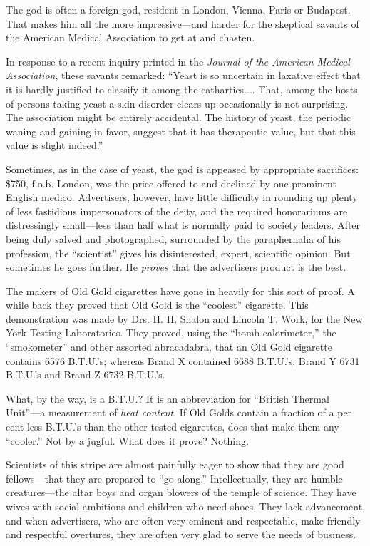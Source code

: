 \documentclass[twoside,nohyper,openany,nobib]{tufte-book}
\begin{document}
The god is often a foreign god, resident in London, Vienna, Paris or
Budapest. That makes him all the more impressive---and harder for the
skeptical savants of the American Medical Association to get at and
chasten.

In response to a recent inquiry printed in the \emph{Journal of the
American Medical Association}, these savants remarked: ``Yeast is so
uncertain in laxative effect that it is hardly justified to classify it
among the cathartics.... That, among the hosts of persons taking yeast a
skin disorder clears up occasionally is not surprising. The association
might be entirely accidental. The history of yeast, the periodic waning
and gaining in favor, suggest that it has therapeutic value, but that
this value is slight indeed.''

Sometimes, as in the case of yeast, the god is appeased by appropriate
sacrifices: \$750, f.o.b. London, was the price offered to and declined
by one prominent English medico. Advertisers, however, have little
difficulty in rounding up plenty of less fastidious impersonators of the
deity, and the required honorariums are distressingly small---less than
half what is normally paid to society leaders. After being duly salved
and photographed, surrounded by the paraphernalia of his profession, the
``scientist'' gives his disinterested, expert, scientific opinion. But
sometimes he goes further. He \emph{proves} that the advertisers product
is the best.

The makers of Old Gold cigarettes have gone in heavily for this sort of
proof. A while back they proved that Old Gold is the ``coolest''
cigarette. This demonstration was made by Drs. H. H. Shalon and Lincoln
T. Work, for the New York Testing Laboratories. They proved, using the
``bomb calorimeter,'' the ``smokometer'' and other assorted abracadabra,
that an Old Gold cigarette contains 6576 B.T.U.'s; whereas Brand X
contained 6688 B.T.U.'s, Brand Y 6731 B.T.U.'s and Brand Z 6732
B.T.U.'s.

What, by the way, is a B.T.U.? It is an abbreviation for ``British
Thermal Unit''---a measurement of \emph{heat content}. If Old Golds
contain a fraction of a per cent less B.T.U.'s than the other tested
cigarettes, does that make them any ``cooler.'' Not by a jugful. What
does it prove? Nothing.

Scientists of this stripe are almost painfully eager to show that they
are good fellows---that they are prepared to ``go along.''
Intellectually, they are humble creatures---the altar boys and organ
blowers of the temple of science. They have wives with social ambitions
and children who need shoes. They lack advancement, and when
advertisers, who are often very eminent and respectable, make friendly
and respectful overtures, they are often very glad to serve the needs of
business.
\end{document}
